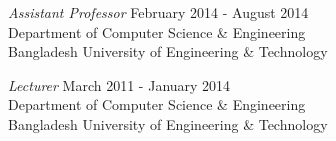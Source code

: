 \documentclass[11pt]{res}
\begin{document}
\begin{resume}
{\sl Assistant Professor} \hfill    February 2014 - August 2014\\
Department of Computer Science \& Engineering\\
Bangladesh University of Engineering \& Technology \\
\begin{comment}
\begin{itemize} \itemsep -2pt %
   \item CSE 307 (Software Engineering \& Information System Design)
\end{itemize}
\end{comment}

{\sl Lecturer} \hfill    March 2011 - January 2014\\
Department of Computer Science \& Engineering\\
Bangladesh University of Engineering \& Technology \\
\begin{comment}
\begin{itemize} \itemsep -2pt %
   \item CSE 105 (Structured Programming Language)
   \item CSE 201 (Object Oriented Programming Language)
\end{itemize}
\end{comment}

\begin{comment}

{\sl Adjunct Faculty} \hfill August 2011 - July 2014\\
Department of Computer Science \& Engineering\\
Ahsanullah University of Science and Technology, Dhaka, Bangladesh\\


{\sl Adjunct Faculty} \hfill August 2011 - July 2014\\
Department of Computer Science \& Engineering\\
University of Liberal Arts Bangladesh, Dhaka, Bangladesh\\

{\sl Adjunct Faculty} \hfill February 2013 - July 2014\\
Department of Computer Science \& Engineering\\
East West University, Dhaka, Bangladesh\\

{\sl Adjunct Faculty} \hfill February 2012 - November 2012\\
Department of Computer Science \& Engineering\\
State University of Bangladesh, Dhaka, Bangladesh\\


\end{comment}
\end{resume}
\end{document}
